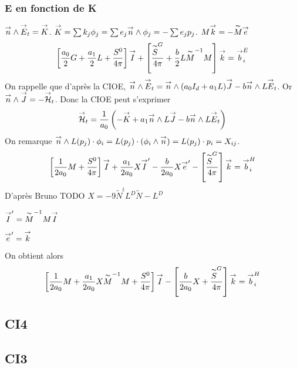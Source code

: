     \subsubsection{E en fonction de K}
    \(\vn \pvect \vE_t = \vK\).
    \(\vK = \sum k_j \phi_j = \sum e_j \vn \pvect \phi_j = -\sum e_j p_j \).
    \(M \vect k = - \tilde M \vect e\)
    \[
    \left[\frac{a_0}{2}G + \frac{a_1}{2}L+\frac{S^0}{4\pi}\right]\vect I + \left[\frac{\tilde S^G }{4\pi}+  \frac{b}{2}L\tilde M^{-1}M \right]\vect k = \vect b_i^E
    \]
    On rappelle que d’après la CIOE, \(\vn \pvect \vE_t = \vn \pvect (a_0I_d+a_1L)\vJ -b\vn\pvect L\vE_t\). Or \(\vn\pvect \vJ = -\vH_t\). Donc la CIOE peut s'exprimer
    \[
    \vH_t = \frac{1}{a_0}\left(-\vK + a_1 \vn\pvect L\vJ -b\vn\pvect L\vE_t\right)
    \]
        On remarque \( \vn \pvect L(p_j)\cdot \phi_i = L(p_j)\cdot(\phi_i\pvect\vn) = L(p_j)\cdot p_i = X_{ij}\). 
    \[
    \left[\frac{1}{2a_0}M + \frac{S^0}{4\pi}\right]\vect I + \frac{a_1}{2a_0}X\vect I' - \frac{b}{2a_0}X\vect e' - \left[ \frac{\tilde S^G}{4\pi}\right]\vect k = \vect b_i^H
    \]
    D’après Bruno TODO \(X = -9\tilde N^tL^D\tilde N - L^D\) %

    \(\vect I' = \tilde M^{-1}M\vect I\)

    \(\vect e' = \vect k\)

    On obtient alors 
    \[
    \left[\frac{1}{2a_0}M + \frac{a_1}{2a_0}X\tilde M^{-1}M + \frac{S^0}{4\pi}\right]\vect I - \left[\frac{b}{2a_0}X+ \frac{\tilde S^G}{4\pi}\right]\vect k = \vect b_i^H
    \]

    \subsection{CI4}
    \subsection{CI3}